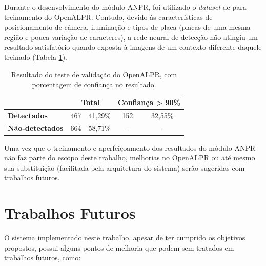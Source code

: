 \documentclass[12pt]{article}
\begin{document}
Durante o desenvolvimento do módulo ANPR, foi utilizado o \textit{dataset} de  para treinamento do OpenALPR. Contudo, devido às características de posicionamento de câmera, iluminação e tipos de placa (placas de uma mesma região e pouca variação de caracteres), a rede neural de detecção não atingiu um resultado satisfatório quando exposta à imagens de um contexto diferente daquele treinado (Tabela \ref{table:opelalpr-results}).

\begin{table}
	\centering
	\begin{tabular}{l|c|c|c|c} 
		\hline
		& \multicolumn{2}{c|}{\textbf{Total}} & \multicolumn{2}{c}{\textbf{Confiança \textgreater{} 90\%}}  \\ 
		\hline
		\textbf{Detectados}     & 467 & 41,29\%                       & 152 & 32,55\%                                               \\
		\textbf{Não-detectados} & 664 & 58,71\%                       & -   & -                                                     \\
		\hline
	\end{tabular}
	\caption{Resultado do teste de validação do OpenALPR, com porcentagem de confiança no resultado.}
	\label{table:opelalpr-results}
\end{table}

Uma vez que o treinamento e aperfeiçoamento dos resultados do módulo ANPR não faz parte do escopo deste trabalho, melhorias no OpenALPR ou até mesmo sua substituição (facilitada pela arquitetura do sistema) serão sugeridas com trabalhos futuros.

\section{Trabalhos Futuros}

O sistema implementado neste trabalho, apesar de ter cumprido os objetivos propostos, possui alguns pontos de melhoria que podem sem tratados em trabalhos futuros, como:
\end{document}
